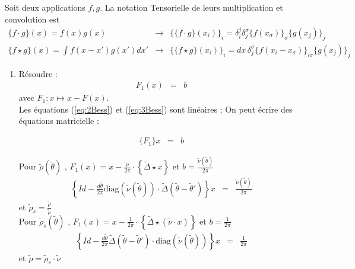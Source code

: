 Soit deux applications $f , g $. La notation Tensorielle de leurs multiplication et convolution est 
\begin{eqnarray}
	\{f \cdot   g \} ( x ) = f(x)  g(x) & \rightarrow & \{ \{ f \cdot g \}( x_i )\}_i   = \delta^j_i \delta^\sigma_j \{f ( x_\sigma ) \}_\sigma \{g(x_j ) \}_j    \\
	\{f \star  g \} ( x ) = {\textstyle \int f ( x - x' ) g ( x' )  d x '}  & \rightarrow &	 \{\{ f \star g  \}(x_i)\}_i  = dx \, \delta^\sigma_j \{  f ( x_i -x_\sigma  )\}_{i\sigma }    \{g ( x_j)\}_j    
\end{eqnarray}


\begin{enumerate}[label = Méthode \arabic*)]
	\item Résoudre :
		\begin{eqnarray}
			F_1 ( x  ) & = & b 	
		\end{eqnarray}
		avec $F_1 \colon x \mapsto x - F(x)$.\\

 

		
		
		Les équations (\ref{eq:2Bess}) et (\ref{eq:3Bess}) sont linéaires ; On peut écrire des équations matricielle :
		
		\begin{eqnarray}
			\{F_1\}  x   & = & b  	
		\end{eqnarray} 
		
		Pour $\tilde{\rho} ( \tilde{\theta} ) $ , $F_1 ( x )= x -  \frac{\tilde{\nu}}{2 \pi} \cdot \left \{\tilde{\Delta} \star x \right  \}  $ et $ b = \frac{\tilde{\nu}(\tilde{\theta}) }{2 \pi}$
		\begin{eqnarray}
			\left \{ Id - \frac{d \tilde{\theta}}{2 \pi} \mbox{diag} ( \tilde{\nu}   ( \tilde{\theta} )) \cdot \tilde{\Delta} ( \tilde{\theta} - \tilde{\theta }' ) \right \} x  &= & \frac{\tilde{\nu}(\tilde{\theta}) }{2 \pi}	
		\end{eqnarray}
		et $ \tilde{ \rho}_s = \frac{\tilde{\rho}}{\tilde{\nu}}$\\
		
		Pour $\tilde{\rho}_s ( \tilde{\theta} ) $ , $F_1 ( x )= x -  \frac{1}{2 \pi} \cdot \left \{\tilde{\Delta} \star (\tilde{\nu} \cdot x )  \right  \}  $ et $ b = \frac{1 }{2 \pi}$
		\begin{eqnarray}
			\left \{ Id - \frac{d \tilde{\theta}}{2 \pi}   \tilde{\Delta} ( \tilde{\theta} - \tilde{\theta }' )  \cdot \mbox{diag} ( \tilde{\nu}   ( \tilde{\theta} )) \right \} x  & = &  \frac{1 }{2 \pi}	
		\end{eqnarray}
		et $\tilde{ \rho} = \tilde{\rho}_s \cdot \tilde{\nu}$\\
		


\end{enumerate}
